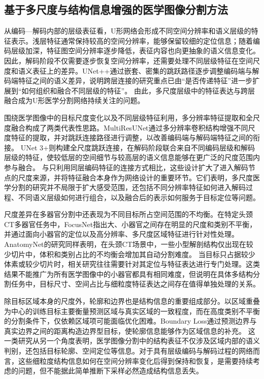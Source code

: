 \subsection{基于多尺度与结构信息增强的医学图像分割方法}

从编码—解码内部的层级表征看，U形网络会形成不同空间分辨率和语义层级的特征表示。浅层特征通常保持较高的空间分辨率，能够保留较细的定位信息；随着编码层级加深，特征图空间分辨率逐步降低，表征内容也向更抽象的语义信息变化。因此，解码阶段不仅需要逐步恢复空间分辨率，还需要处理不同层级特征在空间尺度和语义表征上的差异。UNet++通过嵌套、密集的跳跃路径逐步调整编码端与解码端特征之间的语义差异，说明跨层连接的研究重点已由“是否传递特征”进一步扩展到“如何组织和融合不同层级的特征”。\cite{zhou2018unetpp} 由此，多尺度层级中的特征表达与跨层融合成为U形医学分割网络持续关注的问题。

围绕医学图像中的目标尺度变化以及不同层级特征利用，多分辨率特征提取和全尺度融合构成了两类代表性思路。MultiResUNet通过多分辨率卷积结构增强不同尺度特征的提取，并对跳跃连接路径进行调整，以改善编码端与解码端特征之间的衔接。\cite{ibtehaz2020multiresunet} UNet 3+则构建全尺度跳跃连接，在解码阶段联合来自不同编码层级和解码层级的特征，使较低层的空间细节与较高层的语义信息能够在更广泛的尺度范围内参与融合。\cite{huang2020unet3plus} 与只利用同层编码特征的连接方式相比，这些设计扩大了进入解码节点的尺度来源，并将特征融合本身作为网络设计的重要环节。它们表明，多尺度医学分割的研究并不局限于扩大感受范围，还包括不同分辨率特征如何进入解码过程、不同语义层级如何进行组合，以及融合后的表示如何服务于目标定位等问题。

尺度差异在多器官分割中还表现为不同目标所占空间范围的不均衡。在特定头颈CT多器官任务中，FocusNet指出大、小器官之间存在明显的尺度和类别不平衡，并通过面向小器官的定位以及高分辨率、多尺度区域特征进行针对性处理。\cite{gao2019focusnet} AnatomyNet的研究同样表明，在头颈CT场景中，一些小型解剖结构仅出现在较少切片中，体积和类别占比的不均衡会增加其自动分割难度。\cite{zhu2019anatomynet} 当目标只占据较少体素或较少切片时，相关研究往往需要针对其定位与特征表达进行专门处理。这类结果不能推广为所有医学图像中的小器官都具有相同难度，但说明在具体多结构分割任务中，目标尺寸、空间占比与细粒度特征表达之间存在值得单独处理的关系。

除目标区域本身的尺度外，轮廓和边界也是结构信息的重要组成部分。以区域重叠为中心的训练目标主要衡量预测区域与真实区域的一致程度，而在高度类别不平衡的分割条件下，仅依赖区域项可能面临优化困难。Boundary Loss通过预测边界与真实边界之间的距离构造边界型目标，使轮廓信息能够作为区域信息的补充。\cite{kervadec2021boundary} 这一类研究从另一个角度表明，医学图像分割中的结构表征不仅涉及区域内部的语义判别，还包括目标轮廓、空间定位等信息。对于具有层级编码与解码过程的网络而言，这些细粒度结构信息如何在空间分辨率变化后得到保持和恢复，是需要持续考虑的问题，但不能据此简单推断下采样必然造成结构信息丢失。

